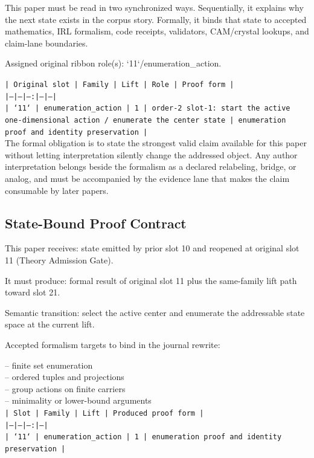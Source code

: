 \documentclass[11pt]{article}
\begin{document}
This paper must be read in two synchronized ways. Sequentially, it explains why
the next state exists in the corpus story. Formally, it binds that state to
accepted mathematics, IRL formalism, code receipts, validators, CAM/crystal
lookups, and claim-lane boundaries.

Assigned original ribbon role(s): `11`/enumeration\_action.

\noindent\texttt{| Original slot | Family | Lift | Role | Proof form |}\\
\noindent\texttt{|---|---|---:|---|---|}\\
\noindent\texttt{| `11` | enumeration\_action | 1 | order-2 slot-1: start the active one-dimensional action / enumerate the center state | enumeration proof and identity preservation |}\\

The formal obligation is to state the strongest valid claim available for this
paper without letting interpretation silently change the addressed object. Any
author interpretation belongs beside the formalism as a declared relabeling,
bridge, or analog, and must be accompanied by the evidence lane that makes the
claim consumable by later papers.

\subsection*{State-Bound Proof Contract}

This paper receives: state emitted by prior slot 10 and reopened at original slot 11 (Theory Admission Gate).

It must produce: formal result of original slot 11 plus the same-family lift path toward slot 21.

Semantic transition: select the active center and enumerate the addressable state space at the current lift.

Accepted formalism targets to bind in the journal rewrite:

\noindent{}-- finite set enumeration\\
\noindent{}-- ordered tuples and projections\\
\noindent{}-- group actions on finite carriers\\
\noindent{}-- minimality or lower-bound arguments\\

\noindent\texttt{| Slot | Family | Lift | Produced proof form |}\\
\noindent\texttt{|---|---|---:|---|}\\
\noindent\texttt{| `11` | enumeration\_action | 1 | enumeration proof and identity preservation |}\\
\end{document}
